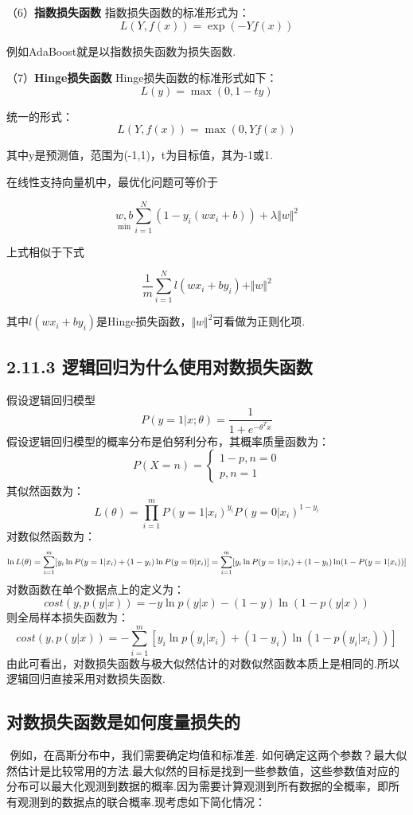 （6）\textbf{指数损失函数} 指数损失函数的标准形式为： \[
L(Y, f(x)) = \exp(-Yf(x))
\]

例如AdaBoost就是以指数损失函数为损失函数.

（7）\textbf{Hinge损失函数} Hinge损失函数的标准形式如下： \[
L(y) = \max{(0, 1-ty)}
\]

统一的形式： \[
L(Y, f(x)) = \max{(0, Yf(x))}
\]

其中y是预测值，范围为(-1,1)，t为目标值，其为-1或1.

在线性支持向量机中，最优化问题可等价于

\[
\underset{\min}{w,b}\sum_{i=1}^N (1-y_i(wx_i+b))+\lambda\Vert w\Vert ^2
\]

上式相似于下式

\[
\frac{1}{m}\sum_{i=1}^{N}l(wx_i+by_i) + \Vert w\Vert ^2
\]

其中$l(wx_i+by_i)$是Hinge损失函数，$\Vert w\Vert ^2$可看做为正则化项.

\subsection{2.11.3
逻辑回归为什么使用对数损失函数}\label{ux903bux8f91ux56deux5f52ux4e3aux4ec0ux4e48ux4f7fux7528ux5bf9ux6570ux635fux5931ux51fdux6570}

假设逻辑回归模型 \[
P(y=1|x;\theta)=\frac{1}{1+e^{-\theta^{T}x}}
\] 假设逻辑回归模型的概率分布是伯努利分布，其概率质量函数为： \[
P(X=n)=
\begin{cases}
1-p, n=0\\
 p,n=1
\end{cases}
\] 其似然函数为： \[
L(\theta)=\prod_{i=1}^{m}
P(y=1|x_i)^{y_i}P(y=0|x_i)^{1-y_i}
\] 对数似然函数为： \[
\ln L(\theta)=\sum_{i=1}^{m}[y_i\ln{P(y=1|x_i)}+(1-y_i)\ln{P(y=0|x_i)}]\\
  =\sum_{i=1}^m[y_i\ln{P(y=1|x_i)}+(1-y_i)\ln(1-P(y=1|x_i))]
\] 对数函数在单个数据点上的定义为： \[
cost(y,p(y|x))=-y\ln{p(y|x)-(1-y)\ln(1-p(y|x))}
\] 则全局样本损失函数为： \[
cost(y,p(y|x)) = -\sum_{i=1}^m[y_i\ln p(y_i|x_i)+(1-y_i)\ln(1-p(y_i|x_i))]
\]
由此可看出，对数损失函数与极大似然估计的对数似然函数本质上是相同的.所以逻辑回归直接采用对数损失函数.

\subsection{对数损失函数是如何度量损失的}\label{ux5bf9ux6570ux635fux5931ux51fdux6570ux662fux5982ux4f55ux5ea6ux91cfux635fux5931ux7684}

​ 例如，在高斯分布中，我们需要确定均值和标准差. ​
如何确定这两个参数？最大似然估计是比较常用的方法.最大似然的目标是找到一些参数值，这些参数值对应的分布可以最大化观测到数据的概率.
​
因为需要计算观测到所有数据的全概率，即所有观测到的数据点的联合概率.现考虑如下简化情况：


